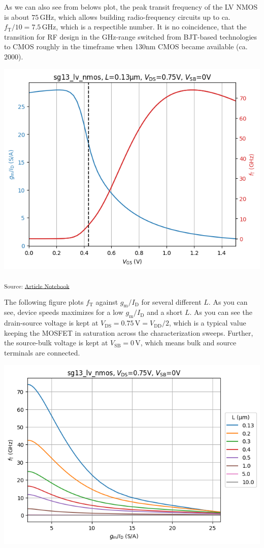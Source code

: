 \documentclass[
  a4paper,
  DIV=11,
  numbers=noendperiod]{scrartcl}
\begin{document}
As we can also see from belows plot, the peak transit frequency of the
LV NMOS is about \(75\,\text{GHz}\), which allows building
radio-frequency circuits up to ca.
\(f_\mathrm{T} / 10 = 7.5\,\text{GHz}\), which is a respectible number.
It is no coincidence, that the transition for RF design in the GHz-range
switched from BJT-based technologies to CMOS roughly in the timeframe
when 130nm CMOS became available (ca. 2000).

\includegraphics{index_files/figure-latex/.-sizing-techsweep_sg13_plots_nmos-cell-6-output-1.png}

\textsubscript{Source:
\href{https://iic-jku.github.io/analog-circuit-design/index.qmd.html}{Article
Notebook}}

The following figure plots \(f_\mathrm{T}\) against
\(g_\mathrm{m}/I_\mathrm{D}\) for several different \(L\). As you can
see, device speeds maximizes for a low \(g_\mathrm{m}/I_\mathrm{D}\) and
a short \(L\). As you can see the drain-source voltage is kept at
\(V_\mathrm{DS}= 0.75\,\text{V} = V_\mathrm{DD}/ 2\), which is a typical
value keeping the MOSFET in saturation across the characterization
sweeps. Further, the source-bulk voltage is kept at
\(V_\mathrm{SB} = 0\,\text{V}\), which means bulk and source terminals
are connected.

\includegraphics{index_files/figure-latex/.-sizing-techsweep_sg13_plots_nmos-cell-9-output-1.png}
\end{document}
